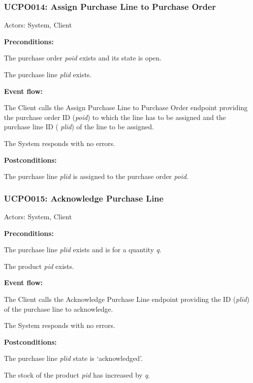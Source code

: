 \begin{ucbox}{\subsubsection{UCPO014: Assign Purchase Line to Purchase Order}}
\label{UCPO014}

Actors: System, Client

\textbf{Preconditions:}

\ucitem The purchase order \textit{poid} exists and its state is open.

\ucitem The purchase line \textit{plid} exists.

\textbf{Event flow:}

\ucitem The Client calls the Assign Purchase Line to Purchase Order endpoint providing the purchase order ID (\textit{poid}) to which the line has to be assigned and the purchase line ID (
\textit{plid}) of the line to be assigned.

\ucitem The System responds with no errors.

\textbf{Postconditions:}

\ucitem The purchase line \textit{plid} is assigned to the purchase order \textit{poid}.

\end{ucbox}

\begin{ucbox}{\subsubsection{UCPO015: Acknowledge Purchase Line}}
\label{UCPO015}

Actors: System, Client

\textbf{Preconditions:}

\ucitem The purchase line \textit{plid} exists and is for a quantity \textit{q}.

\ucitem The product \textit{pid} exists. 

\textbf{Event flow:}

\ucitem The Client calls the Acknowledge Purchase Line endpoint providing the ID (\textit{plid}) of the purchase line to acknowledge.

\ucitem The System responds with no errors.

\textbf{Postconditions:}

\ucitem The purchase line \textit{plid} state is ‘acknowledged’.

\ucitem The stock of the product \textit{pid} has increased by \textit{q}.

\end{ucbox}

